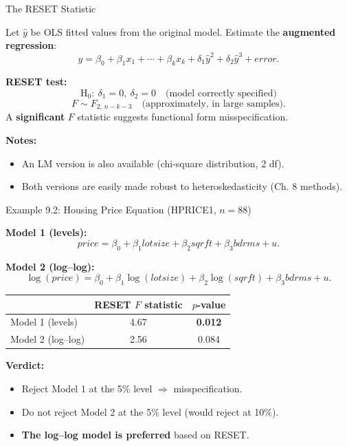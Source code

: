 \documentclass[aspectratio=169, 12pt]{beamer}
\begin{document}
\begin{frame}[shrink=10]{The RESET Statistic}

  Let $\hat{y}$ be OLS fitted values from the original model.
  Estimate the \textbf{augmented regression}:
  \[
    y = \beta_0 + \beta_1 x_1 + \cdots + \beta_k x_k + \delta_1 \hat{y}^2 + \delta_2 \hat{y}^3 + error.
  \]

  \begin{highlightbox}
    \textbf{RESET test:}
    $$\text{H}_0:\ \delta_1 = 0,\ \delta_2 = 0\quad\text{(model correctly specified)}$$
    \[
      F \sim F_{2,\,n-k-3}\quad\text{(approximately, in large samples)}.
    \]
    A \textbf{significant} $F$ statistic suggests functional form misspecification.
  \end{highlightbox}

  \textbf{Notes:}
  \begin{itemize}\setlength{\itemsep}{1pt}
    \item An LM version is also available (chi-square distribution, 2 df).
    \item Both versions are easily made robust to heteroskedasticity (Ch. 8 methods).
  \end{itemize}

\end{frame}

\begin{frame}{Example 9.2: Housing Price Equation (HPRICE1, $n = 88$)}

  \textbf{Model 1 (levels):}
  \[
    price = \beta_0 + \beta_1 \mathit{lotsize} + \beta_2 \mathit{sqrft} + \beta_3 \mathit{bdrms} + u.
  \]

  \textbf{Model 2 (log--log):}
  \[
    \log(\mathit{price}) = \beta_0 + \beta_1 \log(\mathit{lotsize}) + \beta_2 \log(\mathit{sqrft}) + \beta_3 \mathit{bdrms} + u.
  \]

  \begin{center}\footnotesize
  \begin{tabular}{l|cc}
  \hline
  & RESET $F$ statistic & $p$-value \\
  \hline
  Model 1 (levels) & 4.67 & \textbf{0.012} \\
  Model 2 (log--log) & 2.56 & 0.084 \\
  \hline
  \end{tabular}
  \end{center}

  \begin{keybox}
    \textbf{Verdict:}
    \begin{itemize}\setlength{\itemsep}{1pt}
      \item Reject Model 1 at the 5\% level $\Rightarrow$ misspecification.
      \item Do not reject Model 2 at the 5\% level (would reject at 10\%).
      \item \textbf{The log--log model is preferred} based on RESET.
    \end{itemize}
  \end{keybox}

\end{frame}
\end{document}
